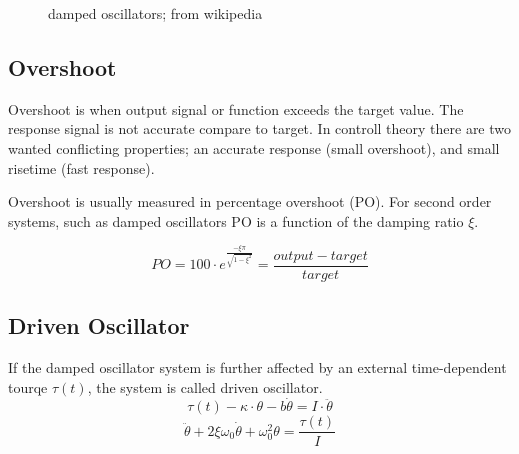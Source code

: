 \documentclass[\main/master.tex]{subfiles}
\begin{document}
\begin{figure}[htbp]
	\centering
	\caption[damped]{damped oscillators; from wikipedia}
	\label{fig:damped_oscillators}
\end{figure}


\subsection{Overshoot}
Overshoot is when output signal or function exceeds the target value. The response signal is not accurate compare to target. In controll theory there are two wanted conflicting properties; an accurate response (small overshoot), and small risetime (fast response). 
\par
Overshoot is usually measured in percentage overshoot (PO). For second order systems, such as damped oscillators PO is a function of the damping ratio $\xi$. 


\begin{equation}
PO = 100\cdot e ^{\frac{-\xi\pi}{\sqrt{1-\xi^2}}} = \frac{output-target}{target}   \label{eqn:percentage_overshoot}
\end{equation}
 



\iffalse
https://ocw.mit.edu/courses/mathematics/18-03sc-differential-equations-fall-2011/unit-ii-second-order-constant-coefficient-linear-equations/damped-harmonic-oscillators/MIT18_03SCF11_s13_2text.pdf

https://www.sciencedirect.com/topics/engineering/underdamped-system#:~:text=When%
\fi

\subsection{Driven Oscillator}
If the damped oscillator system is further affected by an external time-dependent tourqe $\tau(t)$,  the system is called driven oscillator.
\begin{equation}
\tau(t) -\kappa\cdot\theta - b\dot{\theta}  = I\cdot\ddot{\theta}   \label{eqn:driven_motion_equation}
\end{equation} 
\begin{equation}
\ddot{\theta} + 2\xi\omega_0\dot{\theta} + \omega_0^2\theta = \frac{\tau(t)}{I}   \label{eqn:damped_motion_equation}
\end{equation}
\end{document}
